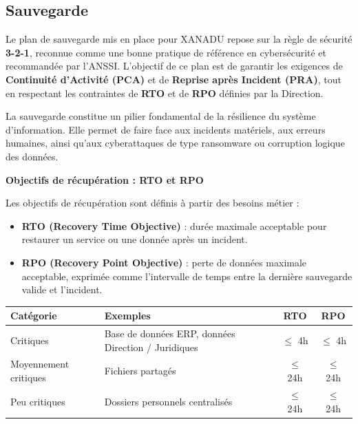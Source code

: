 \subsection*{Sauvegarde}
{}

Le plan de sauvegarde mis en place pour XANADU repose sur la règle de sécurité \textbf{3-2-1}, reconnue comme une bonne pratique de référence en cybersécurité et recommandée par l’ANSSI.
L’objectif de ce plan est de garantir les exigences de \textbf{Continuité d’Activité (PCA)} et de \textbf{Reprise après Incident (PRA)}, tout en respectant les contraintes de \textbf{RTO} et de \textbf{RPO} définies par la Direction.

\noindent La sauvegarde constitue un pilier fondamental de la résilience du système d’information. Elle permet de faire face aux incidents matériels, aux erreurs humaines, ainsi qu’aux cyberattaques de type ransomware ou corruption logique des données.

\noindent \textbf{Objectifs de récupération : RTO et RPO}

\noindent Les objectifs de récupération sont définis à partir des besoins métier :

\begin{itemize}
    \item \textbf{RTO (Recovery Time Objective)} : durée maximale acceptable pour restaurer un service ou une donnée après un incident.
    \item \textbf{RPO (Recovery Point Objective)} : perte de données maximale acceptable, exprimée comme l’intervalle de temps entre la dernière sauvegarde valide et l’incident.
\end{itemize}

\vspace{0.5cm}

\begin{center}
\small
    \begin{tabular}{|p{3cm}|p{8cm}|c|c|}
        \hline
        \textbf{Catégorie} & \textbf{Exemples} & \textbf{RTO} & \textbf{RPO} \\
        \hline
        Critiques & Base de données ERP, données Direction / Juridiques & $\leq$ 4h & $\leq$ 4h \\
        Moyennement critiques & Fichiers partagés & $\leq$ 24h & $\leq$ 24h \\
        Peu critiques & Dossiers personnels centralisés & $\leq$ 24h & $\leq$ 24h \\
        \hline
    \end{tabular}
\end{center}

